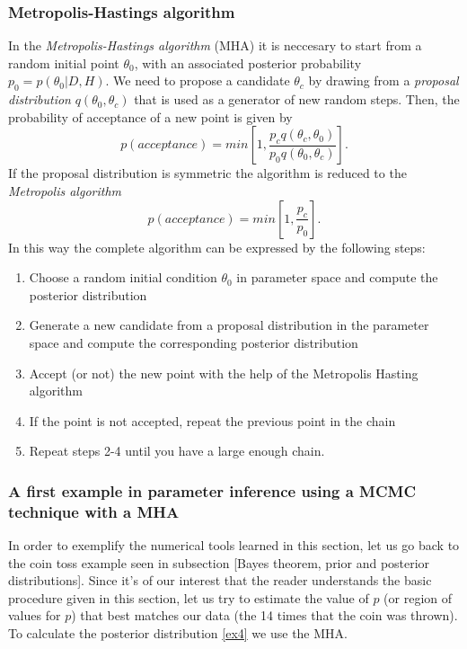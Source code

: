 \documentclass[onecolumn,           %
               showpacs,            %
               preprintnumbers,     %
               aps,                 %
               letterpaper,             %
               superscriptaddress,      %
               nofootinbib,         %
               tightenlines,        %
               floats,floatfix      %
               ,usenatbib,
               ]{revtex4-1}
\begin{document}
\subsubsection{Metropolis-Hastings algorithm}

In the \textit{Metropolis-Hastings algorithm} (MHA) \cite{metr} it is neccesary to start from a random initial point $\theta_0$, with an associated posterior probability $p_0=p(\theta_0|D,H)$. We need to propose a candidate $\theta_c$ by drawing from a \textit{proposal distribution} $q(\theta_0,\theta_c)$ that is used as a generator of new random steps. Then, the probability of acceptance of a new point is given by
\begin{equation}
p(acceptance)=min\left[1,\frac{p_cq(\theta_c,\theta_0)}{p_0q(\theta_0,\theta_c)}\right].
\end{equation}
If the proposal distribution is symmetric the algorithm is reduced to the \textit{Metropolis algorithm}
  \begin{equation}
  p(acceptance)=min\left[1,\frac{p_c}{p_0}\right].
  \end{equation}
In this way the complete algorithm can be expressed by the following steps:
\begin{enumerate}
\item Choose a random initial condition $\theta_0$ in parameter space and compute the posterior distribution
\item Generate a new candidate from a proposal distribution in the parameter space and compute the corresponding posterior distribution
\item Accept (or not) the new point with the help of the Metropolis Hasting algorithm
\item If the point is not accepted, repeat the previous point in the chain
\item Repeat steps 2-4 until you have a large enough chain.
\end{enumerate}

\subsubsection{A first example in parameter inference using a MCMC technique with a MHA}

In order to exemplify the numerical tools learned in this section, let us 
go back to the coin toss example seen in subsection [Bayes theorem, prior and posterior distributions]. Since it's of our interest that the reader understands the basic procedure given in this section, let us try to estimate the value of $p$ (or region of values for $p$) that best matches our data (the 14 times that the coin was thrown). To calculate the posterior distribution \eqref{ex4} we use the MHA. 
\end{document}
